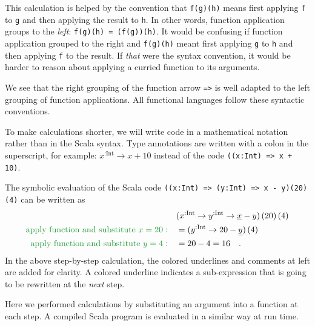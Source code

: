 This calculation is helped by the convention that \lstinline!f(g)(h)!
means first applying \lstinline!f! to \lstinline!g! and then applying
the result to \lstinline!h!. In other words, function application
groups to the \emph{left}: \lstinline!f(g)(h) = (f(g))(h)!. It would
be confusing if function application grouped to the right and \lstinline!f(g)(h)!
meant first applying \lstinline!g! to \lstinline!h! and then applying
\lstinline!f! to the result. If \emph{that} were the syntax convention,
it would be harder to reason about applying a curried function to
its arguments.

We see that the right grouping of the function arrow \lstinline!=>!
is well adapted to the left grouping of function applications. All
functional languages follow these syntactic conventions.

To make calculations shorter, we will write code in a mathematical
notation rather than in the Scala syntax. Type annotations are written
with a colon in the superscript, for example: $x^{:\text{Int}}\rightarrow x+10$
instead of the code \lstinline!((x:Int) => x + 10)!.

The symbolic evaluation of the Scala code \lstinline!((x:Int) => (y:Int) => x - y)(20)(4)!
can be written as
\begin{align*}
 & (x^{:\text{Int}}\rightarrow y^{:\text{Int}}\rightarrow\gunderline x-y)\left(20\right)\left(4\right)\\
{\color{greenunder}\text{apply function and substitute }x=20:}\quad & =(y^{:\text{Int}}\rightarrow20-\gunderline y)\left(4\right)\\
{\color{greenunder}\text{apply function and substitute }y=4:}\quad & =20-4=16\quad.
\end{align*}
In the above step-by-step calculation, the colored underlines and
comments at left are added for clarity. A colored underline indicates
a sub-expression that is going to be rewritten at the \emph{next}
step.

Here we performed calculations by substituting an argument into a
function at each step. A compiled Scala program is evaluated in a
similar way at run time.

